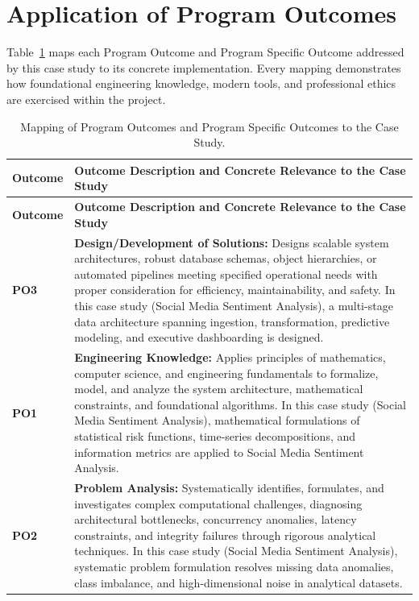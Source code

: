 \section{Application of Program Outcomes}
Table~\ref{tab:po} maps each Program Outcome and Program Specific Outcome addressed by this case study to its concrete implementation. Every mapping demonstrates how foundational engineering knowledge, modern tools, and professional ethics are exercised within the project.

{\small
\begin{longtable}{@{}>{\centering\arraybackslash}p{1.8cm} p{13.2cm}@{}}
    \caption{Mapping of Program Outcomes and Program Specific Outcomes to the Case Study.}\label{tab:po}\\
    \toprule
    \textbf{Outcome} & \textbf{Outcome Description and Concrete Relevance to the Case Study} \\
    \midrule
    \endfirsthead
    \toprule
    \textbf{Outcome} & \textbf{Outcome Description and Concrete Relevance to the Case Study} \\
    \midrule
    \endhead
\textbf{PO3} & \textbf{Design/Development of Solutions:} Designs scalable system architectures, robust database schemas, object hierarchies, or automated pipelines meeting specified operational needs with proper consideration for efficiency, maintainability, and safety. In this case study (Social Media Sentiment Analysis), a multi-stage data architecture spanning ingestion, transformation, predictive modeling, and executive dashboarding is designed. \\
    \addlinespace
\textbf{PO1} & \textbf{Engineering Knowledge:} Applies principles of mathematics, computer science, and engineering fundamentals to formalize, model, and analyze the system architecture, mathematical constraints, and foundational algorithms. In this case study (Social Media Sentiment Analysis), mathematical formulations of statistical risk functions, time-series decompositions, and information metrics are applied to Social Media Sentiment Analysis. \\
    \addlinespace
\textbf{PO2} & \textbf{Problem Analysis:} Systematically identifies, formulates, and investigates complex computational challenges, diagnosing architectural bottlenecks, concurrency anomalies, latency constraints, and integrity failures through rigorous analytical techniques. In this case study (Social Media Sentiment Analysis), systematic problem formulation resolves missing data anomalies, class imbalance, and high-dimensional noise in analytical datasets. \\

\end{longtable}}
